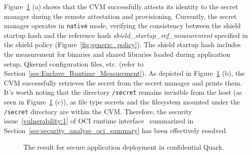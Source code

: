 Figure~\ref{fig:analysis_Secure_Application_Deployment} (a) shows that the \acrshort{CVM} successfully attests its identity to the secret manager during the remote attestation and provisioning. Currently, the secret manager operates in \texttt{native} mode, verifying the consistency 
between the shield startup hash and the reference hash \emph{shield\_startup\_ref\_measurement} specified in the shield policy (Figure~\ref{fig:generic_policy}). The shield startup hash includes the measurement for binaries and shared libraries loaded during application setup, 
Qkernel configuration files, etc. (refer to Section~\ref{sec:Enclave_Runtime_Measurement}). As depicted in Figure~\ref{fig:analysis_Secure_Application_Deployment} (b), the \acrshort{CVM} successfully retrieves the secret from the secret manager and prints them. 
It's worth noting that the directory \texttt{/secret} remains invisible from the host (as seen in Figure~\ref{fig:analysis_Secure_Application_Deployment} (c)), as file type secrets and the filesystem mounted under the \texttt{/secret} directory are within the \acrshort{CVM}. 
Therefore, the security issue~\ref{vulnerability:1} of OCI runtime interface~\cite*{oci-runtime-spec} summarized in Section~\ref{sec:security_analyse_oci_summary} has been effectively resolved.


\begin{figure}[!htb]

    
    
    \caption[The result for secure application deployment in confidential Quark]{The result for secure application deployment in confidential Quark.\label{fig:cquark_deployment}}
    \label{fig:analysis_Secure_Application_Deployment}
\end{figure}


